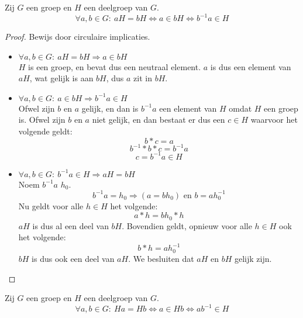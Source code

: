 \documentclass[main.tex]{subfiles}
\begin{document}
\begin{ei}
  \label{ei:linker-nevenklasse-eig}
  Zij $G$ een groep en $H$ een deelgroep van $G$.
  \[ \forall a,b \in G:\ aH = bH \Leftrightarrow a \in bH \Leftrightarrow b^{-1}a \in H \]

  \begin{proof}
    Bewijs door circulaire implicaties.
    \begin{itemize}
    \item $\forall a,b \in G:\ aH = bH \Rightarrow a \in bH$\\
      $H$ is een groep, en bevat dus een neutraal element.
      $a$ is dus een element van $aH$, wat gelijk is aan $bH$, dus $a$ zit in $bH$.
    \item $\forall a,b \in G:\ a \in bH \Rightarrow b^{-1}a \in H$\\
      Ofwel zijn $b$ en $a$ gelijk, en dan is $b^{-1}a$ een element van $H$ omdat $H$ een groep is.
      Ofwel zijn $b$ en $a$ niet gelijk, en dan bestaat er dus een $c \in H$ waarvoor het volgende geldt:
      \[ b*c = a\]
      \[ b^{-1}*b*c = b^{-1}a\]
      \[ c = b^{-1}a \in H \]
    \item $\forall a,b \in G:\ b^{-1}a \in H\Rightarrow aH = bH$\\
      Noem $b^{-1}a$ $h_{0}$.
      \[ b^{-1}a = h_{0} \Rightarrow (a = bh_{0}) \text { en } b = a h_{0}^{-1} \]
      Nu geldt voor alle $h \in H$ het volgende:
      \[ a * h = bh_{0}*h \]
      $aH$ is dus al een deel van $bH$.
      Bovendien geldt, opnieuw voor alle $h \in H$ ook het volgende:
      \[ b * h = ah_{0}^{-1} \]
      $bH$ is dus ook een deel van $aH$.
      We besluiten dat $aH$ en $bH$ gelijk zijn.
   \end{itemize}
  \end{proof}
\end{ei}

\begin{ei}
  \label{ei:rechter-nevenklasse-eig}
  Zij $G$ een groep en $H$ een deelgroep van $G$.
  \[ \forall a,b \in G:\ Ha = Hb \Leftrightarrow a \in Hb \Leftrightarrow ab^{-1} \in H \]

\end{ei}
\end{document}
